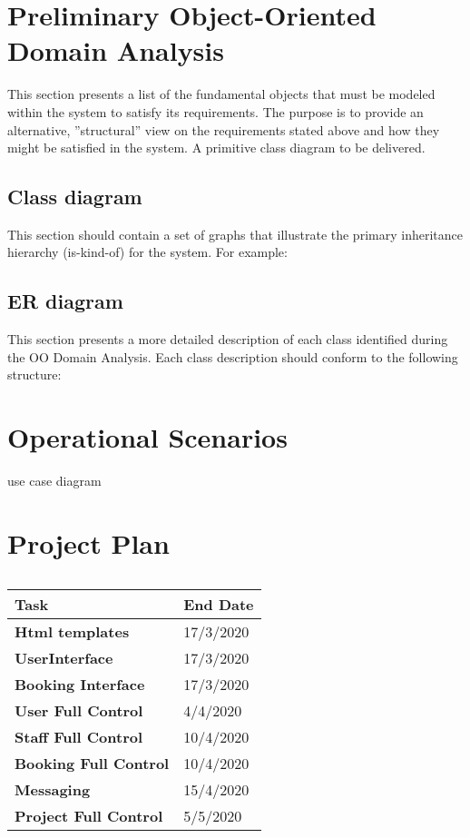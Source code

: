\documentclass[]{article}
\begin{document}
\section{Preliminary Object-Oriented Domain Analysis}
This section presents a list of the fundamental objects that must be modeled within the system to satisfy its requirements. The purpose is to provide an alternative, ''structural'' view on the requirements stated above and how they might be satisfied in the system. A primitive class diagram to be delivered.

\subsection{Class diagram}
This section should contain a set of graphs that illustrate the primary inheritance hierarchy (is-kind-of) for the system. For example: 



\subsection{ER diagram}
This section presents a more detailed description of each class identified during the OO Domain Analysis.
Each class description should conform to the following structure: 



\section{Operational Scenarios}
use case diagram

\section{Project Plan}
\FloatBarrier
\begin{table}[h]
\caption{}
\label{tab:my-table}
\begin{tabular}{|p{}|p{}|}
\hline
\textbf{Task} & \textbf{End Date}
\\ \hline
\textbf{Html templates}  & 17/3/2020            

\\ \hline
\textbf{UserInterface }  &  17/3/2020                          
\\ \hline
\textbf{Booking Interface}  & 17/3/2020
\\ \hline
\textbf{User Full Control}  &  4/4/2020  
\\ \hline
\textbf{Staff Full Control}  &  10/4/2020  

\\ \hline
\textbf{Booking Full Control} & 10/4/2020

\\ \hline
\textbf{Messaging}   & 15/4/2020

\\ \hline
\textbf{Project Full Control} & 5/5/2020

\\ \hline
\end{tabular}
\end{table}
\end{document}
